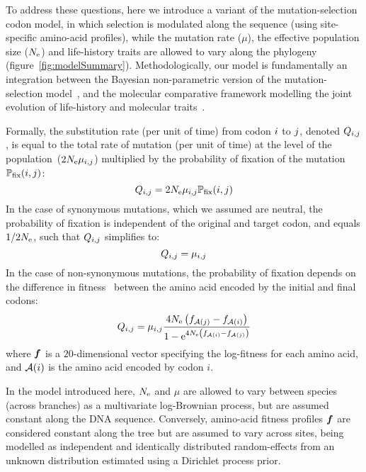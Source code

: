 To address these questions, here we introduce a variant of the mutation-selection \gls{codon} model, in which selection is modulated along the sequence (using site-specific amino-acid profiles), while the mutation rate ($\mu$), the \gls{effective population size} ($N_{\text{e}}$) and life-history traits are allowed to vary along the phylogeny (figure~\ref{fig:modelSummary}).
Methodologically, our model is fundamentally an integration between the Bayesian non-parametric version of the \citet{Halpern1998} mutation-selection model~\citep{Rodrigue2014}, and the molecular comparative framework modelling the joint evolution of life-history and molecular traits~\citep{Lartillot2011}.


Formally, the \gls{substitution} rate (per unit of time) from \gls{codon} ${i}$ to ${j}$, denoted $Q_{{i}, {j}}$, is equal to the total rate of mutation (per unit of time) at the level of the population~($2N_{\text{e}}\mu_{{i}, {j}}$) multiplied by the probability of fixation of the mutation $\mathbb{P}_{\text{fix}}({i}, {j})$:
\begin{equation}
{Q_{{i}, {j}}}
    = 2 N_{\text{e}} \mu_{{i}, {j}} \mathbb{P}_{\text{fix}}({i}, {j})
\end{equation}
In the case of \gls{synonymous} mutations, which we assumed are \gls{neutral}, the probability of fixation is independent of the original and target \gls{codon}, and equals $1/2 N_{\text{e}}$, such that ${Q_{{i}, {j}}}$ simplifies to:
\begin{equation}
    Q_{{i}, {j}} = \mu_{{i}, {j}}
\end{equation}
In the case of \gls{non-synonymous} mutations, the probability of fixation depends on the difference in fitness~\citep{Ohta1992} between the amino acid encoded by the initial and final \glspl{codon}:
\begin{equation}
    \label{eq:mutationSelection}
    {\submatrix_{\itoj}} = \mu_{\itoj} \dfrac{4 \Ne \left({\fitj - \fiti}\right)}{{1 - \e^{4 \Ne \left({\fiti - \fitj}\right)} }}
\end{equation}
where $\bm{f}$ is a $20$-dimensional vector specifying the log-fitness for each amino acid, and $\mathcal{A}({i})$ is the amino acid encoded by \gls{codon} $i$.

In the model introduced here, $N_{\text{e}}$ and $\mu$ are allowed to vary between species (across branches) as a multivariate log-Brownian process, but are assumed constant along the \acrshort{DNA} sequence.
Conversely, amino-acid fitness profiles $\bm{f}$ are considered constant along the tree but are assumed to vary across sites, being modelled as independent and identically distributed random-effects from an unknown distribution estimated using a \gls{Dirichlet process} \gls{prior}.

